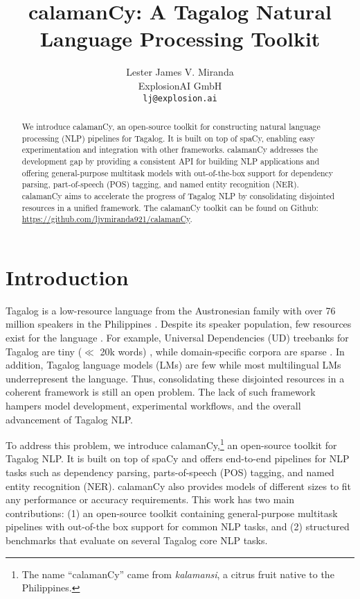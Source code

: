 \documentclass[11pt]{article}
\title{calamanCy: A Tagalog Natural Language Processing Toolkit}
\author{Lester James V. Miranda \\
  ExplosionAI GmbH \\
  \texttt{lj@explosion.ai}}
\begin{document}
\maketitle
\begin{abstract}
  We introduce calamanCy, an open-source toolkit for constructing natural language processing (NLP) pipelines for Tagalog.
  It is built on top of spaCy, enabling easy experimentation and integration with other frameworks.  
  calamanCy addresses the development gap by providing a consistent API for building NLP applications and offering general-purpose multitask models with out-of-the-box support for dependency parsing, part-of-speech (POS) tagging, and named entity recognition (NER).
  calamanCy aims to accelerate the progress of Tagalog NLP by consolidating disjointed resources in a unified framework.
  The calamanCy toolkit can be found on Github: \url{https://github.com/ljvmiranda921/calamanCy}.
\end{abstract}

\section{Introduction}

Tagalog is a low-resource language from the Austronesian family with over 76 million speakers in the Philippines \citep{Lewis2009EthnologueL}.
Despite its speaker population, few resources exist for the language \citep{Cruz2021ImprovingLL}. 
For example, Universal Dependencies (UD) treebanks for Tagalog are tiny ($\ll$ 20k words) \citep{Samson2018TRG,Aquino2020ParsingIT}, 
while domain-specific corpora are sparse \citep{Cabasag2016HatespeechIP,Livelo2018IntelligentDI}. 
In addition, Tagalog language models (LMs) \citep{Cruz2021ImprovingLL,Jiang2021PretrainedLM} are few while most multilingual LMs \citep{Conneau2019UnsupervisedCR,Devlin2019BERTPO} underrepresent the language.
Thus, consolidating these disjointed resources in a coherent framework is still an open problem.
The lack of such framework hampers model development, experimental workflows, and the overall advancement of Tagalog NLP.

To address this problem, we introduce calamanCy,\footnote[1]{
  The name ``calamanCy'' came from \textit{kalamansi}, a citrus fruit native to the Philippines.}
an open-source toolkit for Tagalog NLP. 
It is built on top of spaCy \citep{Honnibal2020Spacy} and offers end-to-end pipelines for NLP tasks such as dependency parsing, parts-of-speech (POS) tagging, and named entity recognition (NER). 
calamanCy also provides models of different sizes to fit any performance or accuracy requirements.
This work has two main contributions: (1) an open-source toolkit containing general-purpose multitask pipelines with out-of-the box support for common NLP tasks, and (2) structured benchmarks that evaluate on several Tagalog core NLP tasks.
\end{document}
